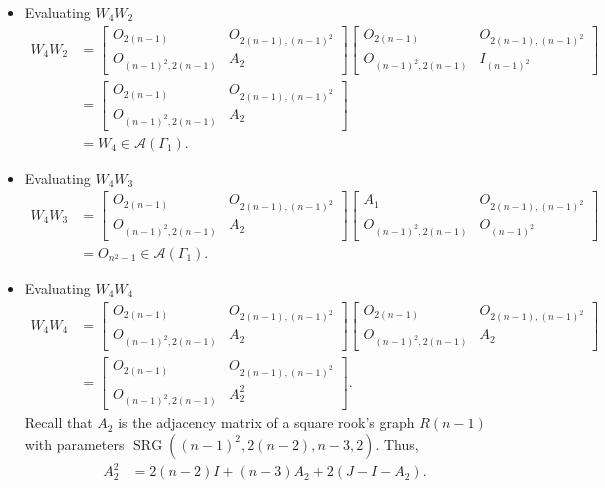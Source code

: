 \begin{itemize}
    \item Evaluating $W_4W_2$
    \begin{align*}
        W_4W_2
        &= \begin{bmatrix}
            O_{2(n-1)} & O_{2(n-1), (n-1)^2} \\
            O_{(n-1)^2, 2(n-1)} & A_2
        \end{bmatrix}\begin{bmatrix}
            O_{2(n-1)} & O_{2(n-1), (n-1)^2} \\
            O_{(n-1)^2, 2(n-1)} & I_{(n-1)^2}
        \end{bmatrix}\\
        &= \begin{bmatrix}
            O_{2(n-1)} & O_{2(n-1), (n-1)^2} \\
            O_{(n-1)^2, 2(n-1)} & A_2
        \end{bmatrix}\\
        &= W_4\in\mathcal{A}(\Gamma_1).
    \end{align*}
    
    \item Evaluating $W_4W_3$
    \begin{align*}
        W_4W_3
        &= \begin{bmatrix}
            O_{2(n-1)} & O_{2(n-1), (n-1)^2} \\
            O_{(n-1)^2, 2(n-1)} & A_2
        \end{bmatrix}\begin{bmatrix}
            A_1 & O_{2(n-1), (n-1)^2} \\
            O_{(n-1)^2, 2(n-1)} & O_{(n-1)^2}
        \end{bmatrix}\\
        &= O_{n^2-1}\in\mathcal{A}(\Gamma_1).
    \end{align*}
    
    \item Evaluating $W_4W_4$
    \begin{align*}
        W_4W_4
        &= \begin{bmatrix}
            O_{2(n-1)} & O_{2(n-1), (n-1)^2} \\
            O_{(n-1)^2, 2(n-1)} & A_2
        \end{bmatrix}\begin{bmatrix}
            O_{2(n-1)} & O_{2(n-1), (n-1)^2} \\
            O_{(n-1)^2, 2(n-1)} & A_2
        \end{bmatrix}\\
        &= \begin{bmatrix}
            O_{2(n-1)} & O_{2(n-1), (n-1)^2} \\
            O_{(n-1)^2, 2(n-1)} & A_2^2
        \end{bmatrix}.
    \end{align*}
    Recall that $A_2$ is the adjacency matrix of a square rook's graph $R(n-1)$ with parameters $\operatorname{SRG}((n-1)^2, 2(n-2), n-3, 2)$. Thus, 
    \begin{align*}
        A_2^2
        &= 2(n-2)I + (n-3)A_2 + 2(J-I-A_2).
    \end{align*}


\end{itemize}
